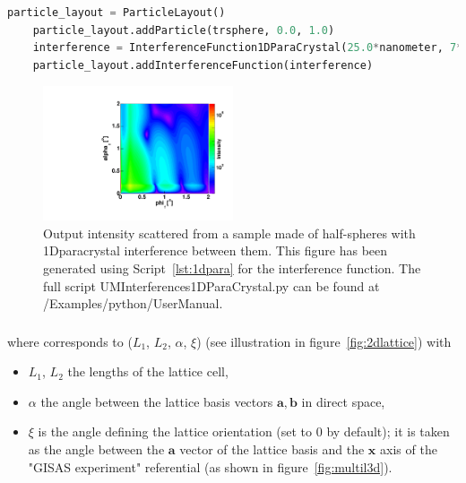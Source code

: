 \begin{lstlisting}[language=python, style=eclipseboxed,numbers=none,nolol,caption={\Code{Python} script to define the 1D paracrystal interference function between half-spheres, where \Code{trsphere} is of type \Code{Particle}.},label={lst:1dpara}]
    particle_layout = ParticleLayout()
    particle_layout.addParticle(trsphere, 0.0, 1.0)
    interference = InterferenceFunction1DParaCrystal(25.0*nanometer, 7*nanometer, 1e3*nanometer)
    particle_layout.addInterferenceFunction(interference)
\end{lstlisting}

\begin{figure}[h]
\begin{center}
\includegraphics[width=0.5\textwidth]{Figures/HSphere_1DDL}
\end{center}
\caption{Output intensity scattered from a sample made of half-spheres with 1Dparacrystal interference between them. This figure has been generated using Script~\ref{lst:1dpara} for the interference function. The full script UMInterferences1DParaCrystal.py can be found at /Examples/python/UserManual.}
\label{fig:1ddl}
\end{figure}

\FloatBarrier

\newpage{\cleardoublepage}
\subsubsection{  } \label{paragraph2dlatt}
where  corresponds to ($L_1$, $L_2$, $\alpha$, $\xi$)  (see illustration in figure~\ref{fig:2dlattice}) with 
\begin{itemize}
\item[]$L_1$, $L_2$ the lengths of the lattice cell, 
\item[]$\alpha$ the angle between the lattice basis vectors $\mathbf{a}, \mathbf{b}$ in direct space,
\item[] $\xi$ is the angle defining the lattice orientation (set to $0$ by default); it is taken as the angle between the $\mathbf{a}$ vector of the lattice basis and the $\mathbf{x}$ axis of the "GISAS experiment" referential (as shown in figure~\ref{fig:multil3d}).
\end{itemize}

